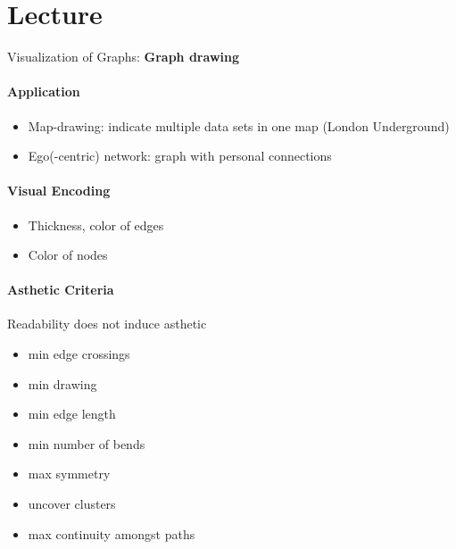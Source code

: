 \documentclass[10pt,a4paper]{article}
\begin{document}
	
	\section{Lecture}
	Visualization of Graphs: \textbf{Graph drawing}
	\paragraph{Application}
	\begin{itemize}
		\item Map-drawing: indicate multiple data sets in one map (London Underground)
		\item Ego(-centric) network: graph with personal connections 
	\end{itemize}
	
	\paragraph{Visual Encoding}
	\begin{itemize}
		\item Thickness, color of edges
		\item Color of nodes
	\end{itemize}
	
	\paragraph{Asthetic Criteria}
	Readability does not induce asthetic
	\begin{itemize}
		\item min edge crossings
		\item min drawing
		\item min edge length
		\item min number of bends
		\item max symmetry
		\item uncover clusters
		\item max continuity amongst paths
	\end{itemize}
	
\end{document}
